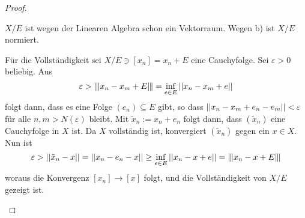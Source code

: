 \documentclass[FunkAnaskriptSS2017.tex]{subfiles}
\begin{document}
\begin{proof}
\begin{enumerate}[(a)]
	$X/E$ ist wegen der Linearen Algebra schon ein Vektorraum. Wegen b) ist $X/E$ normiert.\par 
	Für die Vollständigkeit sei $X/E \ni [x_n] = x_n + E$ eine Cauchyfolge. Sei $\varepsilon > 0$ beliebig. Aus
	$$\varepsilon > \interleave{x_n-x_m+E}\interleave = \inf_{e\in E} \left\lvert \left\lvert x_n-x_m+e \right\rvert \right\rvert$$ 
	folgt dann, dass es eine Folge $(e_n) \subseteq E$ gibt, so dass 
	$\left\lvert \left\lvert x_n-x_m+e_n-e_m \right\rvert \right\rvert < \varepsilon$ für alle $n,m > N(\varepsilon)$ bleibt.
	Mit $\tilde{x}_n:=x_n+e_n$ folgt dann, dass $(\tilde{x}_n)$ eine Cauchyfolge in $X$ ist. Da $X$ vollständig ist, konvergiert $(\tilde{x}_n)$ gegen ein $x\in X$.
	Nun ist
	$$\varepsilon > \left\lvert \left\lvert \tilde{x}_n -x \right\rvert \right\rvert = \left\lvert \left\lvert x_n -e_n -x \right\rvert \right\rvert \geq \inf_{e\in E} \left\lvert \left\lvert x_n -x +e \right\rvert \right\rvert = \interleave{x_n - x +E}\interleave$$
	woraus die Konvergenz $[x_n] \to [x]$ folgt, und die Vollständigkeit von $X/E$ gezeigt ist.		
	\end{enumerate}
\end{proof}




\end{document}
